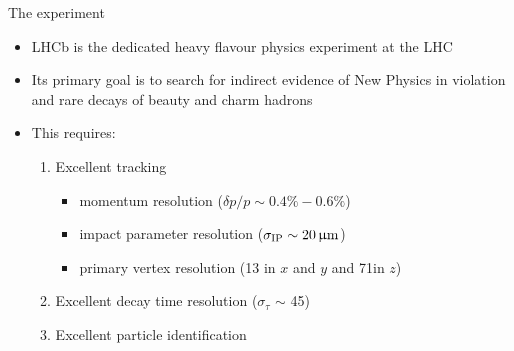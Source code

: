 \documentclass[aspectratio=1610]{beamer}
\begin{document}
\begin{frame}{The \lhcb experiment}
  \begin{itemize}
  \item LHCb is the dedicated heavy flavour physics experiment at the LHC 
  \item Its primary goal is to search for indirect evidence of New Physics in \CP violation and rare decays of beauty and charm hadrons
  \item This requires:
    \begin{enumerate}
    \item Excellent tracking 
      \begin{itemize}
      \item momentum resolution ($\delta p/p \sim 0.4\% - 0.6\%$)
      \item impact parameter resolution ($\sigma_{\rm IP} \sim 20{\,\upmu\mathrm{m}}$)
      \item primary vertex resolution (13 \mum in $x$ and $y$ and 71\mum in $z$)
      \end{itemize}
    \item Excellent decay time resolution ($\sigma_{\tau}$ $\sim$ 45\fs)
    \item Excellent particle identification
    \end{enumerate}
  \end{itemize}

  \bigskip
    

\end{frame}
\end{document}
